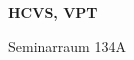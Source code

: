 \documentclass[a4paper]{article}
\begin{document}
\printGenericVSLHeader
\begin{center}
\begin{vsltext}{3cm}{4cm}

   \vspace{0.5cm} 

    \textbf{HCVS, VPT} 

    \vspace{1.5cm}

    Seminarraum 134A

\end{vsltext}

\end{center}
\end{document}
